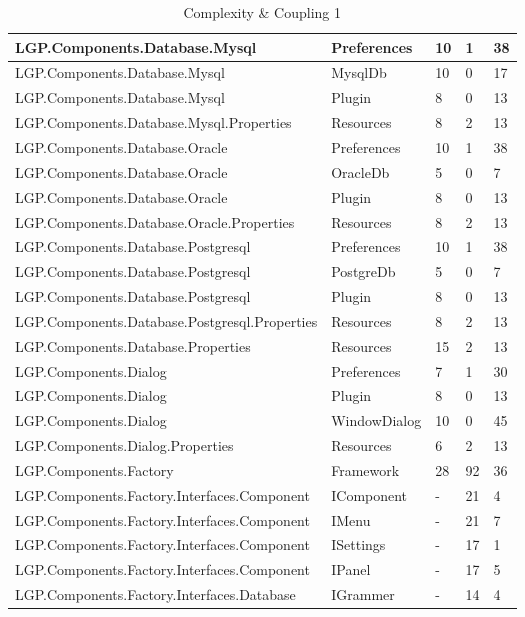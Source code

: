 \begin{table}[h!t]
{\begin{tabular}{ | p{82mm} | p{32mm} | p{10mm} | p{10mm} | p{10mm} | }
				LGP.Components.Database.Mysql & Preferences & 10    & 1     & 38  \\ \hline
				LGP.Components.Database.Mysql & MysqlDb & 10    & 0     & 17  \\ \hline
				LGP.Components.Database.Mysql & Plugin & 8     & 0     & 13  \\ \hline
				LGP.Components.Database.Mysql.Properties & Resources & 8     & 2     & 13  \\ \hline
				LGP.Components.Database.Oracle & Preferences & 10    & 1     & 38  \\ \hline
				LGP.Components.Database.Oracle & OracleDb & 5     & 0     & 7  \\ \hline
				LGP.Components.Database.Oracle & Plugin & 8     & 0     & 13  \\ \hline
				LGP.Components.Database.Oracle.Properties & Resources & 8     & 2     & 13  \\ \hline
				LGP.Components.Database.Postgresql & Preferences & 10    & 1     & 38  \\ \hline
				LGP.Components.Database.Postgresql & PostgreDb & 5     & 0     & 7  \\ \hline
				LGP.Components.Database.Postgresql & Plugin & 8     & 0     & 13  \\ \hline
				LGP.Components.Database.Postgresql.Properties & Resources & 8     & 2     & 13  \\ \hline
				LGP.Components.Database.Properties & Resources & 15    & 2     & 13  \\ \hline
				LGP.Components.Dialog & Preferences & 7     & 1     & 30  \\ \hline
				LGP.Components.Dialog & Plugin & 8     & 0     & 13  \\ \hline
				LGP.Components.Dialog & WindowDialog & 10    & 0     & \cellcolor{ored}45  \\ \hline
				LGP.Components.Dialog.Properties & Resources & 6     & 2     & 13  \\ \hline
				LGP.Components.Factory & Framework & 28    & \cellcolor{ored}92    & 36  \\ \hline
				LGP.Components.Factory.Interfaces.Component & IComponent & -     & \cellcolor{ored}21    & 4  \\ \hline
				LGP.Components.Factory.Interfaces.Component & IMenu & -     & \cellcolor{ored}21    & 7  \\ \hline
				LGP.Components.Factory.Interfaces.Component & ISettings & -     & \cellcolor{ored}17    & 1  \\ \hline
				LGP.Components.Factory.Interfaces.Component & IPanel & -     & \cellcolor{ored}17    & 5  \\ \hline
				LGP.Components.Factory.Interfaces.Database & IGrammer & -     & \cellcolor{ored}14    & 4  \\ \hline
				\end{tabular}}
				
				\caption{Complexity \& Coupling 1}			
				\label{tab:ComplexityCoupling1}
				
			\end{table}
			
